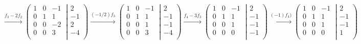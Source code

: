\documentclass[a4paper,12pt]{article}
\begin{document}
$$
\xrightarrow[]{f_3-2f_2}
\left ( \left.\begin{matrix}
1 & 0 & -1 \ \\  
0 & 1 & 1 \ \\ 
0 & 0 & -2 \ \\ 
0 & 0 & 3 \ \\
\end{matrix}\right| \begin{matrix}
2 \\ 
-1\\ 
2 \\
-4 \\ 
\end{matrix}\right )
\xrightarrow[]{(-1/2)f_3}
\left ( \left.\begin{matrix}
1 & 0 & -1 \ \\  
0 & 1 & 1 \ \\ 
0 & 0 & 1 \ \\ 
0 & 0 & 3 \ \\
\end{matrix}\right| \begin{matrix}
2 \\ 
-1\\ 
-1 \\
-4 \\ 
\end{matrix}\right )
\xrightarrow[]{f_4-3f_3}
\left ( \left.\begin{matrix}
1 & 0 & -1 \ \\  
0 & 1 & 1 \ \\ 
0 & 0 & 1 \ \\ 
0 & 0 & 0 \ \\
\end{matrix}\right| \begin{matrix}
2 \\ 
-1\\ 
-1 \\
-1 \\ 
\end{matrix}\right )
\xrightarrow[]{(-1)f_4)}
\left ( \left.\begin{matrix}
1 & 0 & -1 \ \\  
0 & 1 & 1 \ \\ 
0 & 0 & 1 \ \\ 
0 & 0 & 0 \ \\
\end{matrix}\right| \begin{matrix}
2 \\ 
-1\\ 
-1 \\
1 \\ 
\end{matrix}\right )
$$
\end{document}
